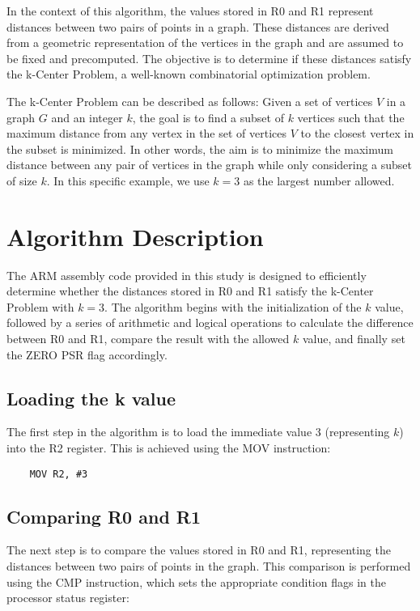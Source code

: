 In the context of this algorithm, the values stored in R0 and R1 represent distances between two pairs of points in a graph. These distances are derived from a geometric representation of the vertices in the graph and are assumed to be fixed and precomputed. The objective is to determine if these distances satisfy the k-Center Problem, a well-known combinatorial optimization problem.

The k-Center Problem can be described as follows: Given a set of vertices $V$ in a graph $G$ and an integer $k$, the goal is to find a subset of $k$ vertices such that the maximum distance from any vertex in the set of vertices $V$ to the closest vertex in the subset is minimized. In other words, the aim is to minimize the maximum distance between any pair of vertices in the graph while only considering a subset of size $k$. In this specific example, we use $k=3$ as the largest number allowed.

\section{Algorithm Description}

The ARM assembly code provided in this study is designed to efficiently determine whether the distances stored in R0 and R1 satisfy the k-Center Problem with $k=3$. The algorithm begins with the initialization of the $k$ value, followed by a series of arithmetic and logical operations to calculate the difference between R0 and R1, compare the result with the allowed $k$ value, and finally set the ZERO PSR flag accordingly.

\subsection{Loading the k value}

The first step in the algorithm is to load the immediate value 3 (representing $k$) into the R2 register. This is achieved using the MOV instruction:

\begin{verbatim}
    MOV R2, #3
\end{verbatim}

\subsection{Comparing R0 and R1}

The next step is to compare the values stored in R0 and R1, representing the distances between two pairs of points in the graph. This comparison is performed using the CMP instruction, which sets the appropriate condition flags in the processor status register:

